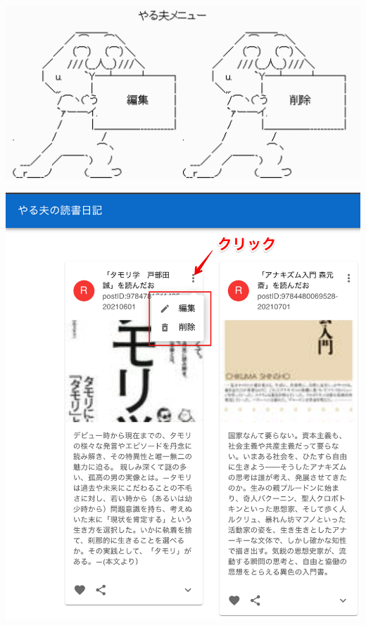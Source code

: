 \begin{reviewimage}[H]%
\includegraphics[width=0.6\maxwidth]{./images/03-todo-with-react/menu.png}%
\label{image:03-todo-with-react:menu}
\end{reviewimage}

\clearpage

\begin{reviewimage}%
\includegraphics[width=0.7\maxwidth]{./images/03-todo-with-react/mui012-card-MenuStep1.png}%
\label{image:03-todo-with-react:mui012-card-MenuStep1}
\end{reviewimage}

